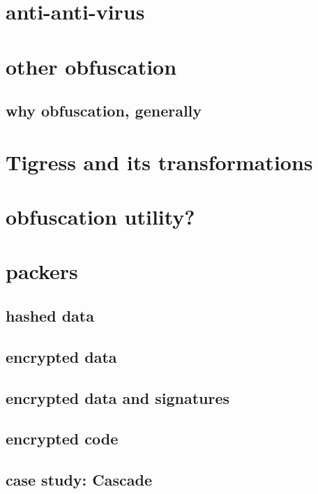 
\section{anti-anti-virus}




\section{other obfuscation}
\subsection{why obfuscation, generally}


\section{Tigress and its transformations}


\section{obfuscation utility?}


\section{packers}
\subsection{hashed data}


\subsection{encrypted data}


\subsection{encrypted data and signatures}


\subsection{encrypted code}


\subsection{case study: Cascade}


